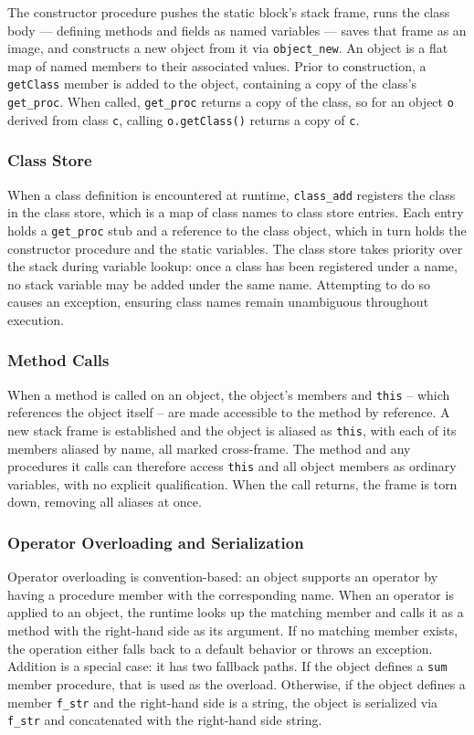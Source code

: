 The constructor procedure pushes the static block's stack frame, runs the class body --- defining methods and fields as named variables --- saves that frame as an image, and constructs a new object from it via \texttt{object\_new}. An object is a flat map of named members to their associated values. Prior to construction, a \texttt{getClass} member is added to the object, containing a copy of the class's \texttt{get\_proc}. When called, \texttt{get\_proc} returns a copy of the class, so for an object \texttt{o} derived from class \texttt{c}, calling \texttt{o.getClass()} returns a copy of \texttt{c}.

\subsubsection{Class Store}

When a class definition is encountered at runtime, \texttt{class\_add} registers the class in the class store, which is a map of class names to class store entries. Each entry holds a \texttt{get\_proc} stub and a reference to the class object, which in turn holds the constructor procedure and the static variables. The class store takes priority over the stack during variable lookup: once a class has been registered under a name, no stack variable may be added under the same name. Attempting to do so causes an exception, ensuring class names remain unambiguous throughout execution.

\subsubsection{Method Calls}

When a method is called on an object, the object's members and \texttt{this} -- which references the object itself -- are made accessible to the method by reference. A new stack frame is established and the object is aliased as \texttt{this}, with each of its members aliased by name, all marked cross-frame. The method and any procedures it calls can therefore access \texttt{this} and all object members as ordinary variables, with no explicit qualification. When the call returns, the frame is torn down, removing all aliases at once.

\subsubsection{Operator Overloading and Serialization}

Operator overloading is convention-based: an object supports an operator by having a procedure member with the corresponding name. When an operator is applied to an object, the runtime looks up the matching member and calls it as a method with the right-hand side as its argument. If no matching member exists, the operation either falls back to a default behavior or throws an exception. Addition is a special case: it has two fallback paths. If the object defines a \texttt{sum} member procedure, that is used as the overload. Otherwise, if the object defines a member \texttt{f\_str} and the right-hand side is a string, the object is serialized via \texttt{f\_str} and concatenated with the right-hand side string.

